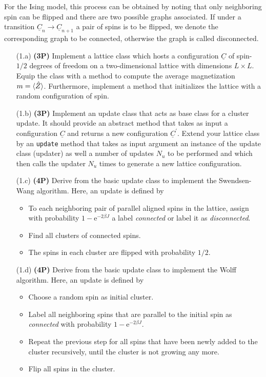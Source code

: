 \documentclass[a4paper, 12pt]{article}
\begin{document}
%
For the Ising model, this process can be obtained by noting that only neighboring spin can be flipped and there are two possible graphs associated.
%
If under a transition $\underline C_n \longrightarrow \underline C_{n+1}$ a pair of spins is to be flipped, we denote the corresponding graph to be connected, otherwise the graph is called disconnected.
%
\begin{itemize}
	\item[(1.a)] \textbf{(3P)}
	Implement a lattice class which hosts a configuration $\underline C$ of spin-$1/2$ degrees of freedom on a two-dimensional lattice with dimensions $L \times L$.
	Equip the class with a method to compute the average magnetization $m=\braket{\hat Z}$.
	Furthermore, implement a method that initializes the lattice with a random configuration of spin.
	\item[(1.b)] \textbf{(3P)}
	Implement an update class that acts as base class for a cluster update.
	It should provide an abstract method that takes as input a configuration $\underline C$ and returns a new configuration $\underline C^\prime$.
	Extend your lattice class by an \texttt{update} method that takes as input argument an instance of the update class (updater) as well a number of updates $N_u$ to be performed and which then calls the updater $N_u$ times to generate a new lattice configuration.
	\item[(1.c)] \textbf{(4P)}
	Derive from the basic update class to implement the Swendsen-Wang algorithm.
	Here, an update is defined by
	\begin{itemize}
		\item To each neighboring pair of parallel aligned spins in the lattice, assign with probability $1-\mathrm{e}^{-2\beta J}$ a label \textit{connected} or label it as \textit{disconnected}.
		\item Find all clusters of connected spins.
		\item The spins in each cluster are flipped with probability $1/2$.
	\end{itemize}
	\item[(1.d)] \textbf{(4P)}
	Derive from the basic update class to implement the Wolff algorithm.
	Here, an update is defined by
	\begin{itemize}
		\item Choose a random spin as initial cluster.
		\item Label all neighboring spins that are parallel to the initial spin as \textit{connected} with probability $1-\mathrm{e}^{-2\beta J}$.
		\item Repeat the previous step for all spins that have been newly added to the cluster recursively, until the cluster is not growing any more.
		\item Flip all spins in the cluster.
	\end{itemize}
\end{itemize}
%
\end{document}
